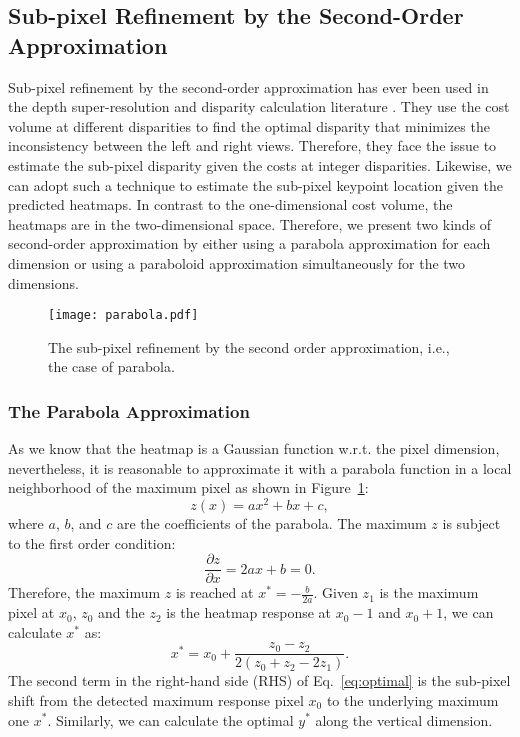 \documentclass[twocolumn]{svjour3}          \smartqed  \usepackage{natbib}
\begin{document}
\subsection{Sub-pixel Refinement by the Second-Order Approximation}
\label{subsec:soa}
Sub-pixel refinement by the second-order approximation has ever been used in the depth super-resolution and disparity calculation literature \citep{yang2007spatial}. They use the cost volume at different disparities to find the optimal disparity that minimizes the inconsistency between the left and right views. Therefore, they face the issue to estimate the sub-pixel disparity given the costs at integer disparities. Likewise, we can adopt such a technique to estimate the sub-pixel keypoint location given the predicted heatmaps. In contrast to the one-dimensional cost volume, the heatmaps are in the two-dimensional space. Therefore, we present two kinds of second-order approximation by either using a parabola approximation for each dimension or using a paraboloid approximation simultaneously for the two dimensions.

\begin{figure}[t]
\centering
\texttt{[image: parabola.pdf]}
\caption{The sub-pixel refinement by the second order approximation, i.e., the case of parabola.}
\label{fig:parabola}
\end{figure}

\subsubsection{The Parabola Approximation}
\label{subsec:parabola}
As we know that the heatmap is a Gaussian function w.r.t. the pixel dimension, nevertheless, it is reasonable to approximate it with a parabola function in a local neighborhood of the maximum pixel as shown in Figure~\ref{fig:parabola}:
\begin{equation}
z \left( x \right) = ax^2 + bx + c,
\label{eq:parabola}
\end{equation}
where $a$, $b$, and $c$ are the coefficients of the parabola. The maximum $z$ is subject to the first order condition:
\begin{equation}
\frac{{\partial z}}{{\partial x}} = 2ax + b = 0.
\label{eq:gradient}
\end{equation}
Therefore, the maximum $z$ is reached at $x^{*} =  - \frac{b}{{2a}}$.
Given $z_1$ is the maximum pixel at $x_0$, $z_0$ and the $z_2$ is the heatmap response at $x_{0}-1$ and $x_{0}+1$, we can calculate $x^{*}$ as:
\begin{equation}
{x^*} = x_0 + \frac{{{z_0} - {z_2}}}{{2\left( {{z_0} + {z_2} - 2{z_1}} \right)}}.
\label{eq:optimal}
\end{equation}
The second term in the right-hand side (RHS) of Eq.~\eqref{eq:optimal} is the sub-pixel shift from the detected maximum response pixel $x_0$ to the underlying maximum one $x^*$. Similarly, we can calculate the optimal $y^{*}$ along the vertical dimension.
\end{document}
